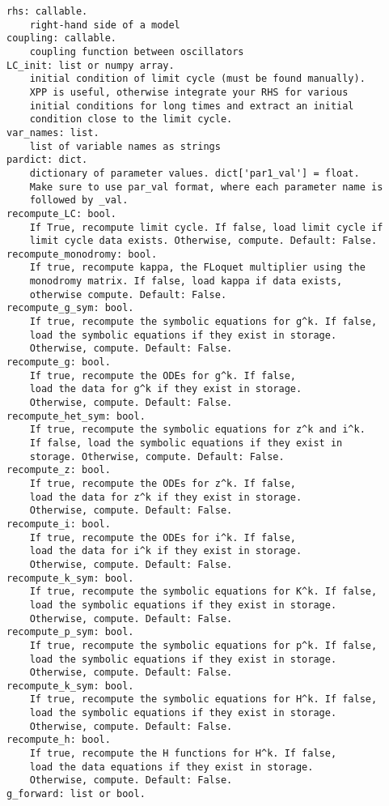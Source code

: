 \documentclass[
  english,
  a4paper,
  oneside]{article}
\begin{document}
\begin{verbatim}
rhs: callable.
    right-hand side of a model
coupling: callable.
    coupling function between oscillators
LC_init: list or numpy array.
    initial condition of limit cycle (must be found manually).
    XPP is useful, otherwise integrate your RHS for various
    initial conditions for long times and extract an initial
    condition close to the limit cycle.
var_names: list.
    list of variable names as strings
pardict: dict.
    dictionary of parameter values. dict['par1_val'] = float.
    Make sure to use par_val format, where each parameter name is
    followed by _val.
recompute_LC: bool.
    If True, recompute limit cycle. If false, load limit cycle if
    limit cycle data exists. Otherwise, compute. Default: False.
recompute_monodromy: bool.
    If true, recompute kappa, the FLoquet multiplier using the
    monodromy matrix. If false, load kappa if data exists,
    otherwise compute. Default: False.
recompute_g_sym: bool.
    If true, recompute the symbolic equations for g^k. If false,
    load the symbolic equations if they exist in storage.
    Otherwise, compute. Default: False.
recompute_g: bool.
    If true, recompute the ODEs for g^k. If false,
    load the data for g^k if they exist in storage.
    Otherwise, compute. Default: False.
recompute_het_sym: bool.
    If true, recompute the symbolic equations for z^k and i^k.
    If false, load the symbolic equations if they exist in
    storage. Otherwise, compute. Default: False.
recompute_z: bool.
    If true, recompute the ODEs for z^k. If false,
    load the data for z^k if they exist in storage.
    Otherwise, compute. Default: False.
recompute_i: bool.
    If true, recompute the ODEs for i^k. If false,
    load the data for i^k if they exist in storage.
    Otherwise, compute. Default: False.
recompute_k_sym: bool.
    If true, recompute the symbolic equations for K^k. If false,
    load the symbolic equations if they exist in storage.
    Otherwise, compute. Default: False.
recompute_p_sym: bool.
    If true, recompute the symbolic equations for p^k. If false,
    load the symbolic equations if they exist in storage.
    Otherwise, compute. Default: False.
recompute_k_sym: bool.
    If true, recompute the symbolic equations for H^k. If false,
    load the symbolic equations if they exist in storage.
    Otherwise, compute. Default: False.
recompute_h: bool.
    If true, recompute the H functions for H^k. If false,
    load the data equations if they exist in storage.
    Otherwise, compute. Default: False.
g_forward: list or bool.

\end{verbatim}
\end{document}
